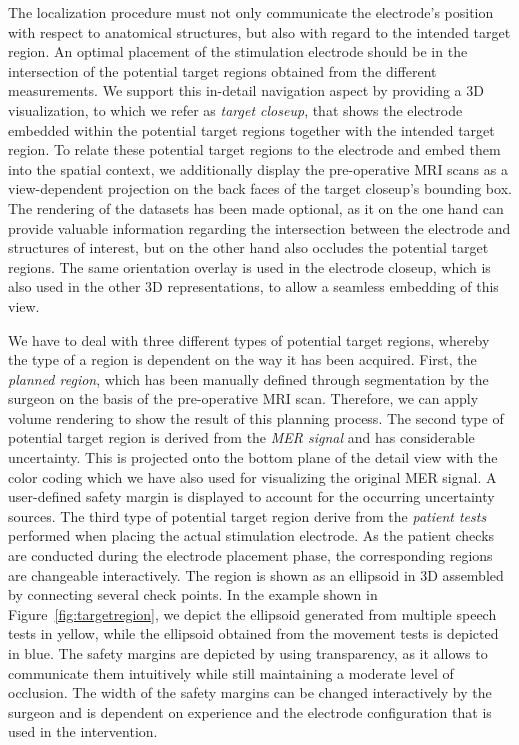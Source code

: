 \documentclass[review]{vgtc}                 %
\begin{document}
The localization procedure must not only communicate the electrode's position with respect to anatomical structures, but also with regard to the intended target region. An optimal placement of the stimulation electrode should be in the intersection of the potential target regions obtained from the different measurements. We support this in-detail navigation aspect by providing a 3D visualization, to which we refer as \emph{target closeup}, that shows the electrode embedded within the potential target regions together with the intended target region. To relate these potential target regions to the electrode and embed them into the spatial context, we additionally display the pre-operative MRI scans as a view-dependent projection on the back faces of the target closeup's bounding box. The rendering of the datasets has been made optional, as it on the one hand can provide valuable information regarding the intersection between the electrode and structures of interest, but on the other hand also occludes the potential target regions. The same orientation overlay is used in the electrode closeup, which is also used in the other 3D representations, to allow a seamless embedding of this view.

We have to deal with three different types of potential target regions, whereby the type of a region is dependent on the way it has been acquired. First, the \emph{planned region}, which has been manually defined through segmentation by the surgeon on the basis of the pre-operative MRI scan. Therefore, we can apply volume rendering to show the result of this planning process. The second type of potential target region is derived from the \emph{MER signal} and has considerable uncertainty. This is projected onto the bottom plane of the detail view with the color coding which we have also used for visualizing the original MER signal. A user-defined safety margin is displayed to account for the occurring uncertainty sources. The third type of potential target region derive from the \emph{patient tests} performed when placing the actual stimulation electrode. As the patient checks are conducted during the electrode placement phase, the corresponding regions are changeable interactively. The region is shown as an ellipsoid in 3D assembled by connecting several check points. In the example shown in Figure~\ref{fig:targetregion}, we depict the ellipsoid generated from multiple speech tests in yellow, while the ellipsoid obtained from the movement tests is depicted in blue. The safety margins are depicted by using transparency, as it allows to communicate them intuitively while still maintaining a moderate level of occlusion. The width of the safety margins can be changed interactively by the surgeon and is dependent on experience and the electrode configuration that is used in the intervention.
\end{document}
